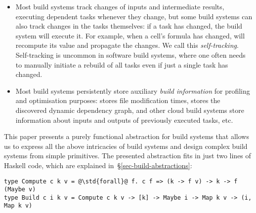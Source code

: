 \begin{itemize}
    \item Most build systems track changes of inputs and intermediate results,
    executing dependent tasks whenever they change, but some build systems can
    also track changes in the tasks themselves: if a task has changed, the build
    system will execute it. For example, when a cell's formula has changed,
    \Excel will recompute its value and propagate the changes. We call this
    \emph{self-tracking}. Self-tracking is uncommon in software build systems,
    where one often needs to manually initiate a rebuild of all tasks even if
    just a single task has changed.

    \item Most build systems persistently store auxiliary \emph{build
    information} for profiling and optimisation purposes: \Make stores file
    modification times, \Shake stores the discovered dynamic dependency graph,
    \Bazel and other cloud build systems store information about inputs and
    outputs of previously executed tasks, etc.
\end{itemize}

This paper presents a purely functional abstraction for build systems that
allows us to express all the above intricacies of build systems and design
complex build systems from simple primitives. The presented abstraction fits in
just two lines of Haskell code, which are explained
in~\S\ref{sec-build-abstractions}:

\begin{verbatim}
type Compute c k v = @\std{forall}@ f. c f => (k -> f v) -> k -> f (Maybe v)
type Build c i k v = Compute c k v -> [k] -> Maybe i -> Map k v -> (i, Map k v)
\end{verbatim}



